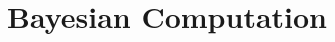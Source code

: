 
\chapter{Bayesian Computation}
\minitoc

\citep{Gelman:2013}

\clearpage
\printbibliography[segment=\therefsegment,heading=subbibintoc]
